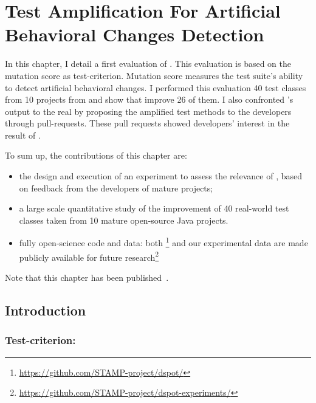 \chapter{Test Amplification For Artificial Behavioral Changes Detection}
\label{chap:test-improvement}

\begin{chaptersummary}
	In this chapter, I detail a first evaluation of \dspot. 
	This evaluation is based on the mutation score as test-criterion.
	Mutation score measures the test suite's ability to detect artificial behavioral changes.
	I performed this evaluation 40 test classes from 10 projects from \gh and show that \dspot improve 26 of them.
	I also confronted \dspot's output to the real by proposing the amplified test methods to the developers through pull-requests.
	These pull requests showed developers' interest in the result of \dspot.
	
	To sum up, the contributions of this chapter are:
	\begin{itemize}
		\item the design and execution of an experiment to assess the relevance of \dspot, based on feedback from the developers of mature projects;
		\item a large scale quantitative study of the improvement of 40 real-world test classes taken from 10 mature open-source Java projects.	
		\item fully open-science code and data: both \dspot\footnote{\url{https://github.com/STAMP-project/dspot/}} and our experimental data are made publicly available for future research\footnote{\url{https://github.com/STAMP-project/dspot-experiments/}}
	\end{itemize}
	Note that this chapter has been published~\cite{Danglot2019}.
\end{chaptersummary}

\minitoc

\graphicspath{{.}{chapitres/test-improvement/}}

\section{Introduction}
\label{sec:test-improvement:introduction}

\subsection{Test-criterion: \ms}
\label{subsec:test-improvement:introduction:test-criterion}

